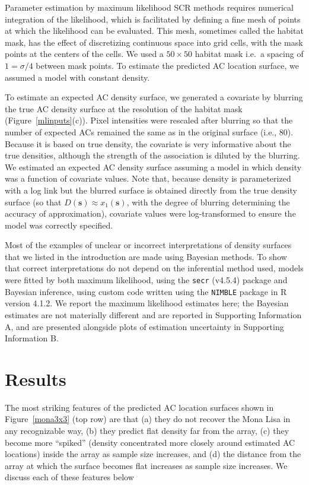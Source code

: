 \documentclass[useAMS,usenatbib,referee]{biom}
\begin{document}
Parameter estimation by maximum likelihood SCR methods requires numerical integration of the likelihood, which is facilitated by defining a fine mesh of points at which the likelihood can be evaluated. This mesh, sometimes called the habitat mask, has the effect of discretizing continuous space into grid cells, with the mask points at the centers of the cells. We used a $50\times 50$ habitat mask i.e.\, a spacing of $1=\sigma/4$ between mask points. To estimate the predicted AC location surface, we assumed a model with constant density. 

To estimate an expected AC density surface, we generated a covariate by blurring the true AC density surface at the resolution of the habitat mask (Figure~\ref{mlinputs}(c)). Pixel intensities were rescaled after blurring so that the number of expected ACs remained the same as in the original surface (i.e., 80). Because it is based on true density, the covariate is very informative about the true densities, although the strength of the association is diluted by the blurring. We estimated an expected AC density surface assuming a model in which density was a function of covariate values. Note that, because density is parameterized with a log link but the blurred surface is obtained directly from the true density surface (so that $D(\mathbf{s})\approx x_1(\mathbf{s})$, with the degree of blurring determining the accuracy of approximation), covariate values were log-transformed to ensure the model was correctly specified.

Most of the examples of unclear or incorrect interpretations of density surfaces that we listed in the introduction are made using Bayesian methods. To show that correct interpretations do not depend on the inferential method used, models were fitted by both maximum likelihood, using the \texttt{secr} (v4.5.4) package \citep{secr:22} and Bayesian inference, using custom code written using the \texttt{NIMBLE} package \citep{deValpine:17, Turek:21} in R version 4.1.2. We report the maximum likelihood estimates here; the Bayesian estimates are not materially different and are reported in Supporting Information A, and are presented alongside plots of estimation uncertainty in Supporting Information B.

\section{Results}
The most striking features of the predicted AC location surfaces shown in Figure~\ref{mona3x3} (top row) are that (a) they do not recover the Mona Lisa in any recognizable way, (b) they predict flat density far from the array, (c) they become more ``spiked'' (density concentrated more closely around estimated AC locations) inside the array as sample size increases, and (d) the distance from the array at which the surface becomes flat increases as sample size increases. We discuss each of these features below
\end{document}

